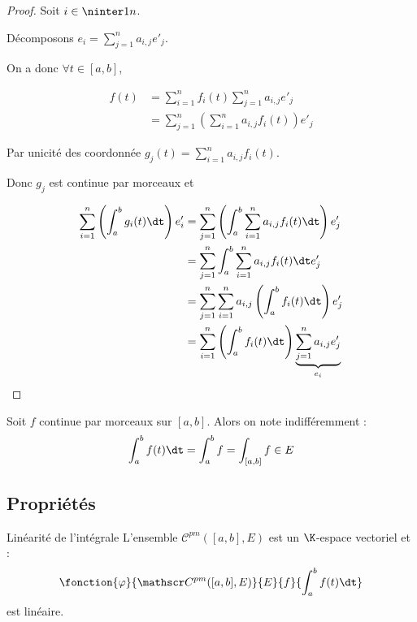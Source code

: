 \begin{proof}
    Soit $i \in \ninter 1 n$. 

    Décomposons $e_i = \displaystyle \sum_{j=1}^n a_{i,j} e'_j$.

    On a donc $\forall t \in [a, b]$, 

    \begin{align*}
        f(t) & = \sum_{i=1}^n f_i(t) \sum_{j=1}^n a_{i,j} e'_j \\
        & = \sum_{j=1}^n \left( \sum_{i=1}^n a_{i,j} f_i(t) \right) e'_j
    \end{align*}

    Par unicité des coordonnée $\displaystyle g_j(t) = \sum_{i=1}^n a_{i,j} f_i(t)$.

    Donc $g_j$ est continue par morceaux et 

    \begin{align*}
        \sum_{i=1}^n \left( \int_a^b g_i(t) \dt \right) e'_i & = \sum_{j=1}^n \left( \int_a^b \sum_{i=1}^n a_{i,j} f_i(t) \dt \right) e'_j \\
            & = \sum_{j=1}^n \int_a^b \sum_{i=1}^n a_{i,j} f_i(t) \dt e'_j \\
            & = \sum_{j=1}^n \sum_{i=1}^n a_{i,j} \left( \int_a^b f_i(t) \dt \right) e'_j \\
            & = \sum_{i=1}^n \left( \int_a^b f_i(t) \dt \right) \underbrace{\sum_{j=1}^n a_{i,j} e'_j}_{e_i} \\ 
    \end{align*}
\end{proof}

\begin{remarque}
Soit $f$ continue par morceaux sur $[a, b]$. Alors on note indifféremment :
\[\int_a^b f(t) \dt = \int_a^b f = \int_{[a, b]} f \in E\]
\end{remarque}

\subsection{Propriétés}

\begin{proposition}{Linéarité de l'intégrale}{}
    L'ensemble $\mathscr C^{pm}([a, b], E)$ est un $\K$-espace vectoriel et :
    \[\fonction{\varphi}{\mathscr C^{pm}([a, b], E)}{E}{f}{\int_a^b f(t) \dt}\]
    est linéaire. 
\end{proposition}


